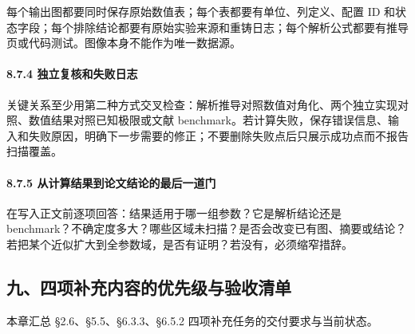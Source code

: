 \documentclass[
]{article}
\begin{document}
每个输出图都要同时保存原始数值表；每个表都要有单位、列定义、配置 ID
和状态字段；每个排除结论都要有原始实验来源和重铸日志；每个解析公式都要有推导页或代码测试。图像本身不能作为唯一数据源。

\paragraph{8.7.4
独立复核和失败日志}\label{ux72ecux7acbux590dux6838ux548cux5931ux8d25ux65e5ux5fd7}

关键关系至少用第二种方式交叉检查：解析推导对照数值对角化、两个独立实现对照、数值结果对照已知极限或文献
benchmark。若计算失败，保存错误信息、输入和失败原因，明确下一步需要的修正；不要删除失败点后只展示成功点而不报告扫描覆盖。

\paragraph{8.7.5
从计算结果到论文结论的最后一道门}\label{ux4eceux8ba1ux7b97ux7ed3ux679cux5230ux8bbaux6587ux7ed3ux8bbaux7684ux6700ux540eux4e00ux9053ux95e8}

在写入正文前逐项回答：结果适用于哪一组参数？它是解析结论还是
benchmark？不确定度多大？哪些区域未扫描？是否会改变已有图、摘要或结论？若把某个近似扩大到全参数域，是否有证明？若没有，必须缩窄措辞。

\subsection{九、四项补充内容的优先级与验收清单}\label{ux4e5dux56dbux9879ux8865ux5145ux5185ux5bb9ux7684ux4f18ux5148ux7ea7ux4e0eux9a8cux6536ux6e05ux5355}

本章汇总 §2.6、§5.5、§6.3.3、§6.5.2 四项补充任务的交付要求与当前状态。
\end{document}
